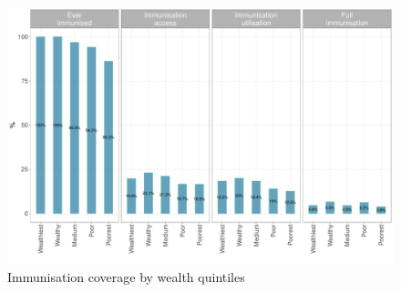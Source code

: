 \documentclass[12pt,a4paper]{article}
\begin{document}
\begin{figure}[H]

{\centering \includegraphics{kayinReport_files/figure-latex/epi2plot-1} 

}

\caption{Immunisation coverage by wealth quintiles}\label{fig:epi2plot}
\end{figure}
\end{document}
